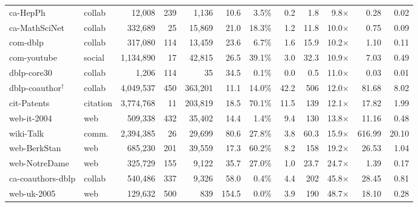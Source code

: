 \begin{tabular}{@{}llrrrrrrrrrr@{}}
ca-HepPh & collab & 12,008 & 239 & 1,136 & 10.6 & 3.5\% & 0.2 & 1.8 & 9.8$\times$ & 0.28 & 0.02 \\
ca-MathSciNet & collab & 332,689 & 25 & 15,869 & 21.0 & 18.3\% & 1.2 & 11.8 & 10.0$\times$ & 0.75 & 0.09 \\
com-dblp & collab & 317,080 & 114 & 13,459 & 23.6 & 6.7\% & 1.6 & 15.9 & 10.2$\times$ & 1.10 & 0.11 \\
com-youtube & social & 1,134,890 & 17 & 42,815 & 26.5 & 39.1\% & 3.0 & 32.3 & 10.9$\times$ & 7.03 & 0.49 \\
dblp-core30 & collab & 1,206 & 114 & 35 & 34.5 & 0.1\% & 0.0 & 0.5 & 11.0$\times$ & 0.03 & 0.01 \\
dblp-coauthor$^\dagger$ & collab & 4,049,537 & 450 & 363,201 & 11.1 & 14.0\% & 42.2 & 506 & 12.0$\times$ & 81.68 & 8.02 \\
cit-Patents & citation & 3,774,768 & 11 & 203,819 & 18.5 & 70.1\% & 11.5 & 139 & 12.1$\times$ & 17.82 & 1.99 \\
web-it-2004 & web & 509,338 & 432 & 35,402 & 14.4 & 1.4\% & 9.4 & 130 & 13.8$\times$ & 11.16 & 0.48 \\
wiki-Talk & comm. & 2,394,385 & 26 & 29,699 & 80.6 & 27.8\% & 3.8 & 60.3 & 15.9$\times$ & 616.99 & 20.10 \\
web-BerkStan & web & 685,230 & 201 & 39,559 & 17.3 & 60.2\% & 8.2 & 158 & 19.2$\times$ & 26.53 & 1.04 \\
web-NotreDame & web & 325,729 & 155 & 9,122 & 35.7 & 27.0\% & 1.0 & 23.7 & 24.7$\times$ & 1.39 & 0.17 \\
ca-coauthors-dblp & collab & 540,486 & 337 & 9,326 & 58.0 & 0.4\% & 4.4 & 202 & 45.8$\times$ & 28.45 & 0.81 \\
web-uk-2005 & web & 129,632 & 500 & 839 & 154.5 & 0.0\% & 3.9 & 190 & 48.7$\times$ & 18.10 & 0.28 \\
\bottomrule
\end{tabular}
